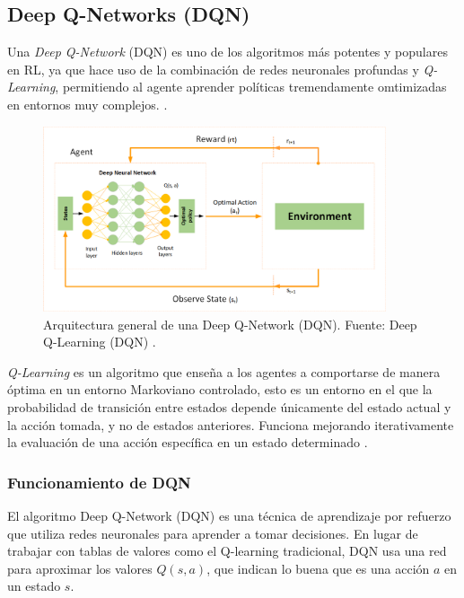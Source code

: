 \subsection{Deep Q-Networks (DQN)}
Una \textit{Deep Q-Network} (DQN) es uno de los algoritmos más potentes y populares en RL, ya que 
hace uso de la combinación de redes neuronales profundas y \textit{Q-Learning}, permitiendo al
agente aprender políticas tremendamente omtimizadas en entornos muy complejos. \cite{dhumne2019dqn}.

\begin{figure}[ht]
    \centering
    \includegraphics[width=0.9\textwidth]{images/image.png}
    \caption{Arquitectura general de una Deep Q-Network (DQN). Fuente: Deep Q-Learning (DQN)
    \cite{amin2020dqn}.}
    \label{fig:dqn_architecture}
\end{figure}

\textit{Q-Learning} es un algoritmo que enseña a los agentes a comportarse de manera óptima en un 
entorno Markoviano controlado, esto es un entorno en el que la probabilidad de transición entre 
estados depende únicamente del estado actual y la acción tomada, y no de estados anteriores. 
Funciona mejorando iterativamente la evaluación de una acción específica en un estado determinado
\cite{watkins1992qlearning}.

\subsubsection{Funcionamiento de DQN \cite{mnih2013dqn}}
El algoritmo Deep Q-Network (DQN) es una técnica de aprendizaje por refuerzo que utiliza redes 
neuronales para aprender a tomar decisiones. En lugar de trabajar con tablas de valores como el 
Q-learning tradicional, DQN usa una red para aproximar los valores \( Q(s, a) \), que indican lo 
buena que es una acción \( a \) en un estado \( s \).

